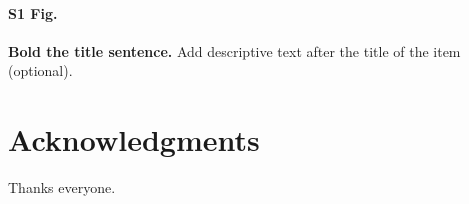 \documentclass[10pt,letterpaper]{article}
\begin{document}
\paragraph*{S1 Fig.}
\label{S1_Fig}
{\bf Bold the title sentence.} Add descriptive text after the title of the item (optional).


\section*{Acknowledgments}
Thanks everyone.
\nolinenumbers

%
%
% 
 



\end{document}
